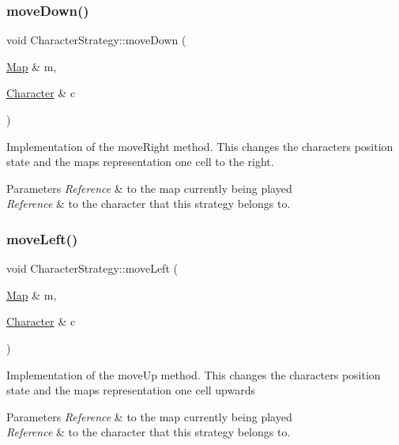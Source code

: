 \subsubsection{\texorpdfstring{move\+Down()}{moveDown()}}
{\footnotesize\ttfamily void Character\+Strategy\+::move\+Down (\begin{DoxyParamCaption}\item[{\hyperlink{class_map}{Map} \&}]{m,  }\item[{\hyperlink{class_character}{Character} \&}]{c }\end{DoxyParamCaption})}

Implementation of the move\+Right method. This changes the character\textquotesingle{}s position state and the map\textquotesingle{}s representation one cell to the right. 
\begin{DoxyParams}{Parameters}
{\em Reference} & to the map currently being played \\
\hline
{\em Reference} & to the character that this strategy belongs to. \\
\hline
\end{DoxyParams}
\hypertarget{class_character_strategy_a51452280934c3abbcd0c2c94b90f54c6}{}\label{class_character_strategy_a51452280934c3abbcd0c2c94b90f54c6} 
\subsubsection{\texorpdfstring{move\+Left()}{moveLeft()}}
{\footnotesize\ttfamily void Character\+Strategy\+::move\+Left (\begin{DoxyParamCaption}\item[{\hyperlink{class_map}{Map} \&}]{m,  }\item[{\hyperlink{class_character}{Character} \&}]{c }\end{DoxyParamCaption})}

Implementation of the move\+Up method. This changes the character\textquotesingle{}s position state and the map\textquotesingle{}s representation one cell upwards 
\begin{DoxyParams}{Parameters}
{\em Reference} & to the map currently being played \\
\hline
{\em Reference} & to the character that this strategy belongs to. \\
\hline
\end{DoxyParams}
\hypertarget{class_character_strategy_ae669d1f7dbfc7bdad6b1a1e26363d5dc}{}\label{class_character_strategy_ae669d1f7dbfc7bdad6b1a1e26363d5dc} 
